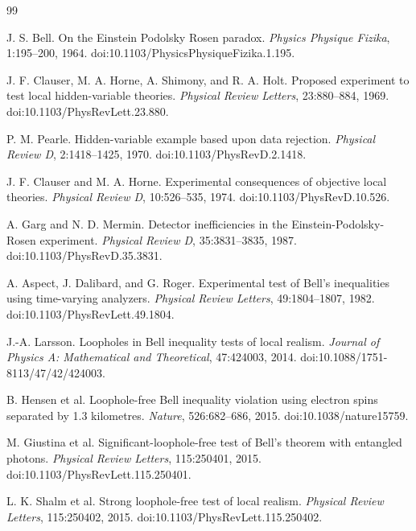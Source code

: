 \documentclass[11pt]{article}
\begin{document}
\begin{thebibliography}{99}

J. S. Bell.
\newblock On the Einstein Podolsky Rosen paradox.
\newblock \emph{Physics Physique Fizika}, 1:195--200, 1964.
\newblock doi:10.1103/PhysicsPhysiqueFizika.1.195.

J. F. Clauser, M. A. Horne, A. Shimony, and R. A. Holt.
\newblock Proposed experiment to test local hidden-variable theories.
\newblock \emph{Physical Review Letters}, 23:880--884, 1969.
\newblock doi:10.1103/PhysRevLett.23.880.

P. M. Pearle.
\newblock Hidden-variable example based upon data rejection.
\newblock \emph{Physical Review D}, 2:1418--1425, 1970.
\newblock doi:10.1103/PhysRevD.2.1418.

J. F. Clauser and M. A. Horne.
\newblock Experimental consequences of objective local theories.
\newblock \emph{Physical Review D}, 10:526--535, 1974.
\newblock doi:10.1103/PhysRevD.10.526.

A. Garg and N. D. Mermin.
\newblock Detector inefficiencies in the Einstein-Podolsky-Rosen experiment.
\newblock \emph{Physical Review D}, 35:3831--3835, 1987.
\newblock doi:10.1103/PhysRevD.35.3831.

A. Aspect, J. Dalibard, and G. Roger.
\newblock Experimental test of Bell's inequalities using time-varying analyzers.
\newblock \emph{Physical Review Letters}, 49:1804--1807, 1982.
\newblock doi:10.1103/PhysRevLett.49.1804.

J.-A. Larsson.
\newblock Loopholes in Bell inequality tests of local realism.
\newblock \emph{Journal of Physics A: Mathematical and Theoretical}, 47:424003, 2014.
\newblock doi:10.1088/1751-8113/47/42/424003.

B. Hensen et al.
\newblock Loophole-free Bell inequality violation using electron spins separated by 1.3 kilometres.
\newblock \emph{Nature}, 526:682--686, 2015.
\newblock doi:10.1038/nature15759.

M. Giustina et al.
\newblock Significant-loophole-free test of Bell's theorem with entangled photons.
\newblock \emph{Physical Review Letters}, 115:250401, 2015.
\newblock doi:10.1103/PhysRevLett.115.250401.

L. K. Shalm et al.
\newblock Strong loophole-free test of local realism.
\newblock \emph{Physical Review Letters}, 115:250402, 2015.
\newblock doi:10.1103/PhysRevLett.115.250402.


\end{thebibliography}
\end{document}
